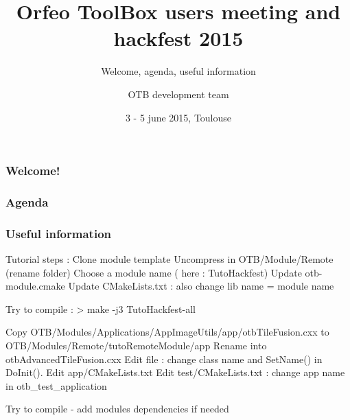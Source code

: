 \documentclass[8pt]{beamer}
\title{Orfeo ToolBox users meeting and hackfest 2015}
\subtitle{Welcome, agenda, useful information}
\author{OTB development team}%
\date{3 - 5 june 2015, Toulouse}
\begin{document}
\begin{frame}
\titlepage
\end{frame}

\begin{frame}
\frametitle{Welcome!}

\end{frame}

\begin{frame}
\frametitle{Agenda}

\end{frame}

\begin{frame}
\frametitle{Useful information}

Tutorial steps :
Clone module template
Uncompress in OTB/Module/Remote
(rename folder)
Choose a module name ( here : TutoHackfest)
Update otb-module.cmake
Update CMakeLists.txt : also change lib name = module name

Try to compile :
 > make -j3 TutoHackfest-all

Copy OTB/Modules/Applications/AppImageUtils/app/otbTileFusion.cxx to OTB/Modules/Remote/tutoRemoteModule/app
Rename into otbAdvancedTileFusion.cxx
Edit file : change class name and SetName() in DoInit().
Edit app/CMakeLists.txt
Edit test/CMakeLists.txt : change app name in otb_test_application

Try to compile
   - add modules dependencies if needed






\end{frame}
\end{document}

